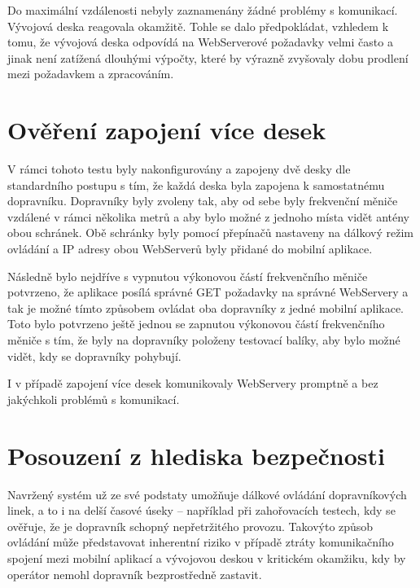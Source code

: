 Do maximální vzdálenosti nebyly zaznamenány žádné problémy s komunikací. Vývojová deska reagovala okamžitě. Tohle se dalo předpokládat, vzhledem k tomu, že vývojová deska odpovídá na WebServerové požadavky velmi často a jinak není zatížená dlouhými výpočty, které by výrazně zvyšovaly dobu prodlení mezi požadavkem a zpracováním.

\section{Ověření zapojení více desek}

V rámci tohoto testu byly nakonfigurovány a zapojeny dvě desky dle standardního postupu s tím, že každá deska byla zapojena k samostatnému dopravníku. Dopravníky byly zvoleny tak, aby od sebe byly frekvenční měniče vzdálené v rámci několika metrů a aby bylo možné z jednoho místa vidět antény obou schránek. Obě schránky byly pomocí přepínačů nastaveny na dálkový režim ovládání a IP adresy obou WebServerů byly přidané do mobilní aplikace.

Následně bylo nejdříve s vypnutou výkonovou částí frekvenčního měniče potvrzeno, že aplikace posílá správné GET požadavky na správné WebServery a tak je možné tímto způsobem ovládat oba dopravníky z jedné mobilní aplikace. Toto bylo potvrzeno ještě jednou se zapnutou výkonovou částí frekvenčního měniče s tím, že byly na dopravníky položeny testovací balíky, aby bylo možné vidět, kdy se dopravníky pohybují.

I v případě zapojení více desek komunikovaly WebServery promptně a bez jakýchkoli problémů s komunikací.

\section{Posouzení z hlediska bezpečnosti}\label{sec:PosouzeniZHlediskaBezpecnosti}

Navržený systém už ze své podstaty umožňuje dálkové ovládání dopravníkových linek, a to i na delší časové úseky – například při zahořovacích testech, kdy se ověřuje, že je dopravník schopný nepřetržitého provozu. Takovýto způsob ovládání může představovat inherentní riziko v případě ztráty komunikačního spojení mezi mobilní aplikací a vývojovou deskou v kritickém okamžiku, kdy by operátor nemohl dopravník bezprostředně zastavit.

